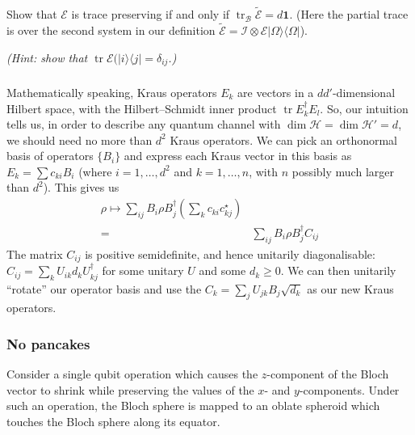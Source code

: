 \documentclass[fleqn]{article}
\begin{document}
\hypertarget{section-41}{%
\subsubsection{}\label{section-41}}

Show that \(\mathcal{E}\) is trace preserving if and only if \(\operatorname{tr}_\mathcal{B}\widetilde{\mathcal{E}} = d\mathbf{1}\).
(Here the partial trace is over the second system in our definition \(\widetilde{\mathcal{E}} =\mathcal{I}\otimes\mathcal{E}|\Omega\rangle\langle\Omega|\)).

\emph{(Hint: show that \(\operatorname{tr}\mathcal{E}(|i\rangle\langle j|=\delta_{ij}\).)}

\hypertarget{section-42}{%
\subsubsection{}\label{section-42}}

Mathematically speaking, Kraus operators \(E_k\) are vectors in a \(dd'\)-dimensional Hilbert space, with the Hilbert--Schmidt inner product \(\operatorname{tr}E^\dagger_k E_l\).
So, our intuition tells us, in order to describe any quantum channel with \(\dim\mathcal{H}=\dim\mathcal{H}'=d\), we should need no more than \(d^2\) Kraus operators.
We can pick an orthonormal basis of operators \(\{B_i\}\) and express each Kraus vector in this basis as \(E_k=\sum c_{ki} B_i\) (where \(i=1,\ldots,d^2\) and \(k=1,\ldots,n\), with \(n\) possibly much larger than \(d^2\)).
This gives us
\[
  \begin{aligned}
    \rho
    \longmapsto
    \sum_{ij} B_i\rho B^\dagger_j \left(\sum _k c_{ki}c^\star_{kj}\right)
  \\=& \sum_{ij} B_i\rho B^\dagger_j  C_{ij}
  \end{aligned}
\]
The matrix \(C_{ij}\) is positive semidefinite, and hence unitarily diagonalisable: \(C_{ij}=\sum_k U_{ik} d_k U^\dagger_{kj}\) for some unitary \(U\) and some \(d_k\geqslant 0\).
We can then unitarily ``rotate'' our operator basis and use the \(C_k=\sum_j U_{jk}B_j \sqrt{d_k}\) as our new Kraus operators.

\hypertarget{no-pancakes}{%
\subsubsection{No pancakes}\label{no-pancakes}}

Consider a single qubit operation which causes the \(z\)-component of the Bloch vector to shrink while preserving the values of the \(x\)- and \(y\)-components.
Under such an operation, the Bloch sphere is mapped to an oblate spheroid which touches the Bloch sphere along its equator.
\end{document}
